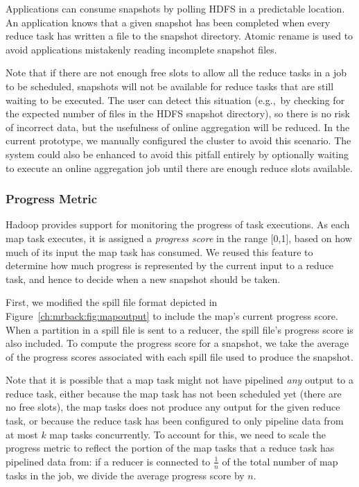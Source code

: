 Applications can consume snapshots by polling HDFS in a predictable
location. An application knows that a given snapshot has been
completed when every reduce task has written a file to the snapshot
directory.  Atomic rename is used to avoid applications mistakenly
reading incomplete snapshot files.

Note that if there are not enough free slots to allow all the reduce tasks in a
job to be scheduled, snapshots will not be available for reduce tasks that are
still waiting to be executed. The user can detect this situation (e.g.,\ by
checking for the expected number of files in the HDFS snapshot directory), so
there is no risk of incorrect data, but the usefulness of online aggregation
will be reduced. In the current prototype, we manually configured the cluster to
avoid this scenario. The system could also be enhanced to avoid this pitfall
entirely by optionally waiting to execute an online aggregation job until there
are enough reduce slots available.

\subsubsection{Progress Metric}
\label{ch:hop:sec:online-metric}
Hadoop provides support for monitoring the progress of task
executions. As each map task executes, it is assigned a \emph{progress
  score} in the range [0,1], based on how much of its input the map
task has consumed. We reused this feature to determine how much
progress is represented by the current input to a reduce task, and
hence to decide when a new snapshot should be taken.

First, we modified the spill file format depicted in
Figure~\ref{ch:mrback:fig:mapoutput} to include the map's current progress
score. When a partition in a spill file is sent to a reducer, the
spill file's progress score is also included. To compute the progress
score for a snapshot, we take the average of the progress scores
associated with each spill file used to produce the snapshot.

Note that it is possible that a map task might not have pipelined
\emph{any} output to a reduce task, either because the map task has
not been scheduled yet (there are no free {\TT} slots), the map tasks does 
not produce any output for the given reduce task, or because the reduce task has 
been configured to only pipeline data from at most $k$ map tasks concurrently. 
To account for this, we need to scale the progress metric to reflect the portion 
of the map tasks that a reduce task has pipelined data from: if a reducer is 
connected to $\frac{1}{n}$ of the total number of map tasks in the job, we divide
the average progress score by $n$.

